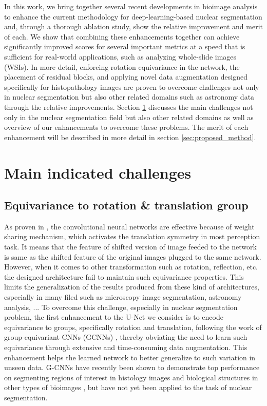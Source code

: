 In this work, we bring together several recent developments in bioimage analysis to enhance the current methodology for deep-learning-based nuclear segmentation and, through a thorough ablation study, show the relative improvement and merit of each. We show that combining these enhancements together can achieve significantly improved scores for several important metrics at a speed that
is sufficient for real-world applications, such as analyzing
whole-slide images (WSIs). In more detail, enforcing rotation equivariance in the network, the placement of residual blocks, and applying novel data augmentation designed
specifically for histopathology images are proven to overcome challenges not only in nuclear segmentation but also other related domains such as astronomy data through the relative improvements. Section \ref{sec:main_challenges} discusses the main challenges not only in the nuclear segmentation field but also other related domains as well as overview of our enhancements to overcome these problems. The merit of each enhancement will be described in more detail in section \ref{sec:proposed_method}. 

\section{Main indicated challenges}
\label{sec:main_challenges}
\subsection{Equivariance to rotation \& translation group}

As proven in \cite{gcnn}, the convolutional neural networks are effective because of weight sharing mechanism, which activates the translation symmetry in most perception task. It means that the feature of shifted version of image feeded to the network is same as the shifted feature of the original images plugged to the same network. However, when it comes to other transformation such as rotation, reflection, etc. the designed architecture fail to maintain such equivariance properties. This limits the generalization of the results produced from these kind of architectures, especially in many filed such as microscopy image segmentation, astronomy analysis, ... To overcome this challenge, especially in nuclear segmentation problem, the first enhancement to the U-Net we consider is to encode equivariance to groups, specifically rotation and translation, following the work of group-equivariant CNNs (GCNNs) \cite{gcnn}, thereby obviating the need to learn such equivariance through extensive and time-consuming data augmentation. This enhancement helps the learned network to better generalize to such variation in unseen data. G-CNNs have recently been shown to demonstrate top performance on segmenting regions of interest in histology images \cite{DBLP:journals/corr/abs-1806-03962} and biological structures in other types of bioimages \cite{DBLP:journals/corr/abs-1804-03393}, but have not yet been applied to the task of nuclear segmentation.

